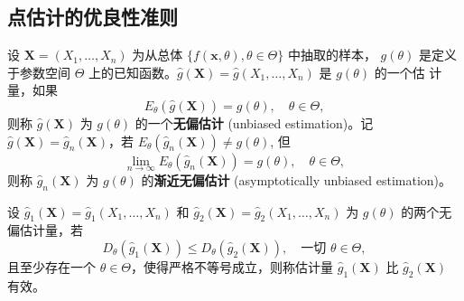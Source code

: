 \subsection{点估计的优良性准则}\label{subsec:点估计的优良性准则}
\begin{definition}[无偏估计与渐近无偏估计]\label{def:unbiased_estimation}
设 $\mathbf{X} = (X_1, \dots, X_n)$ 为从总体 $\{f(\mathbf{x}, \theta), \theta \in \Theta\}$ 中抽取的样本，
$g(\theta)$ 是定义于参数空间 $\Theta$ 上的已知函数。$\hat{g}(\mathbf{X}) = \hat{g}(X_1, \dots, X_n)$ 是 $g(\theta)$ 的一个估
计量，如果
\begin{equation}
E_\theta(\hat{g}(\mathbf{X})) = g(\theta), \quad \theta \in \Theta, \label{eq:unbiased}
\end{equation}
则称 $\hat{g}(\mathbf{X})$ 为 $g(\theta)$ 的一个\textbf{无偏估计} (unbiased estimation)。记 $\hat{g}(\mathbf{X}) = \hat{g}_n(\mathbf{X})$，若
$E_\theta(\hat{g}_n(\mathbf{X})) \neq g(\theta)$, 但
\begin{equation}
\lim_{n\to\infty} E_\theta(\hat{g}_n(\mathbf{X})) = g(\theta), \quad \theta \in \Theta, \label{eq:asymptotically_unbiased}
\end{equation}
则称 $\hat{g}_n(\mathbf{X})$ 为 $g(\theta)$ 的\textbf{渐近无偏估计} (asymptotically unbiased estimation)。
\end{definition}

\begin{definition}[有效性]\label{def:efficient_estimator}
设 $\hat{g}_1(\mathbf{X}) = \hat{g}_1(X_1, \dots, X_n)$ 和 $\hat{g}_2(\mathbf{X}) = \hat{g}_2(X_1, \dots, X_n)$ 为 $g(\theta)$
的两个无偏估计量，若
\begin{equation}
D_\theta(\hat{g}_1(\mathbf{X})) \leq D_\theta(\hat{g}_2(\mathbf{X})), \quad \text{一切 } \theta \in \Theta, \label{eq:efficiency_condition}
\end{equation}
且至少存在一个 $\theta \in \Theta$，使得严格不等号成立，则称估计量 $\hat{g}_1(\mathbf{X})$ 比 $\hat{g}_2(\mathbf{X})$ 有效。
\end{definition}

